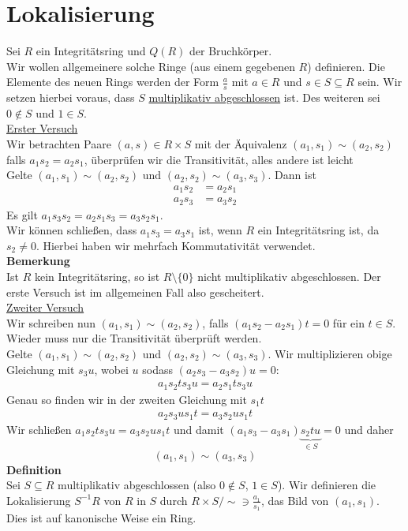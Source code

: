 \documentclass[a4paper, 12pt]{article}
\begin{document}
\section{Lokalisierung}
Sei $R$ ein Integritätsring und $Q(R)$ der Bruchkörper.\\
Wir wollen allgemeinere solche Ringe (aus einem gegebenen $R$) definieren. Die Elemente des neuen Rings werden der Form $\frac{a}{s}$ mit $a \in R$ und $s \in S \subseteq R$ sein. Wir setzen hierbei voraus, dass $S$ \underline{multiplikativ abgeschlossen} ist. Des weiteren sei $0 \not\in S$ und $1 \in S$.\\
\underline{Erster Versuch}\\
Wir betrachten Paare $(a,s) \in R\times S$ mit der Äquivalenz $(a_1,s_1) \sim (a_2,s_2)$ falls $a_1s_2 = a_2s_1$, überprüfen wir die Transitivität, alles andere ist leicht\\
Gelte $(a_1,s_1) \sim (a_2,s_2)$ und $(a_2,s_2) \sim (a_3,s_3)$. Dann ist \begin{align*}
	a_1s_2 &= a_2s_1\\
	a_2s_3 &= a_3s_2
\end{align*}
Es gilt $a_1s_3s_2 = a_2s_1s_3 = a_3s_2s_1$.\\
Wir können schließen, dass $a_1s_3 = a_3s_1$ ist, wenn $R$ ein Integritätsring ist, da $s_2 \neq 0$. Hierbei haben wir mehrfach Kommutativität verwendet.\\
\textbf{Bemerkung}\\
Ist $R$ kein Integritätsring, so ist $R \setminus \{0\}$ nicht multiplikativ abgeschlossen. Der erste Versuch ist im allgemeinen Fall also gescheitert.\\
\underline{Zweiter Versuch}\\
Wir schreiben nun $(a_1,s_1) \sim (a_2,s_2)$, falls $(a_1s_2-a_2s_1)t = 0$ für ein $t \in S$. Wieder muss nur die Transitivität überprüft werden.\\
Gelte $(a_1,s_1) \sim (a_2,s_2)$ und $(a_2,s_2) \sim (a_3,s_3)$. Wir multiplizieren obige Gleichung mit $s_3u$, wobei $u$ sodass $(a_2s_3-a_3s_2)u = 0$:\begin{align*}
	a_1s_2ts_3u = a_2s_1ts_3u
\end{align*}
Genau so finden wir in der zweiten Gleichung mit $s_1t$ \begin{align*}
	a_2s_3us_1t = a_3s_2us_1t
\end{align*}
Wir schließen $a_1s_2ts_3u = a_3s_2us_1t$ und damit $(a_1s_3-a_3s_1)\underbrace{s_2tu}_{\in S} = 0$ und daher \[(a_1,s_1) \sim (a_3,s_3)\]
\textbf{Definition}\\
Sei $S \subseteq R$ multiplikativ abgeschlossen (also $0 \notin S$, $1 \in S$). Wir definieren die Lokalisierung $S^{-1}R$ von $R$ in $S$ durch $R\times S /\sim \ni \frac{a_1}{s_1}$, das Bild von $(a_1,s_1)$.\\
Dies ist auf kanonische Weise ein Ring.\\
\end{document}
